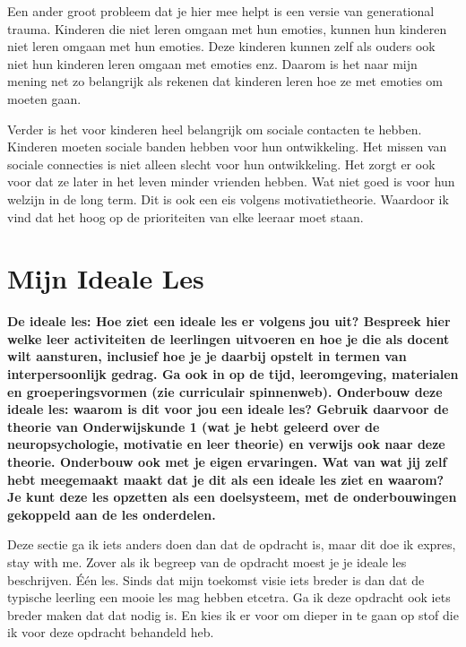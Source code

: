 \documentclass{article}
\begin{document}
            Een ander groot probleem dat je hier mee helpt is een versie van generational trauma. Kinderen die niet leren omgaan met hun emoties, kunnen hun kinderen niet leren omgaan met hun emoties. Deze kinderen kunnen zelf als ouders ook niet hun kinderen leren omgaan met emoties enz. Daarom is het naar mijn mening net zo belangrijk als rekenen dat kinderen leren hoe ze met emoties om moeten gaan.
            
            Verder is het voor kinderen heel belangrijk om sociale contacten te hebben. Kinderen moeten sociale banden hebben voor hun ontwikkeling.\cite{social-isolation-affect-a-childs-mental-health-and-development} Het missen van sociale connecties is niet alleen slecht voor hun ontwikkeling. Het zorgt er ook voor dat ze later in het leven minder vrienden hebben. Wat niet goed is voor hun welzijn in de long term. Dit is ook een eis volgens motivatietheorie. Waardoor ik vind dat het hoog op de prioriteiten van elke leeraar moet staan.
    
    
    \section{Mijn Ideale Les}

        \textbf{De ideale les: Hoe ziet een ideale les er volgens jou uit? Bespreek hier welke leer activiteiten de leerlingen uitvoeren en hoe je die als docent wilt aansturen, inclusief hoe je je daarbij opstelt in termen van interpersoonlijk gedrag. Ga ook in op de tijd, leeromgeving, materialen en groeperingsvormen (zie curriculair spinnenweb). Onderbouw deze ideale les: waarom is dit voor jou een ideale les? Gebruik daarvoor de theorie van Onderwijskunde 1 (wat je hebt geleerd over de neuropsychologie, motivatie en leer theorie) en verwijs ook naar deze theorie. Onderbouw ook met je eigen ervaringen. Wat van wat jij zelf hebt meegemaakt maakt dat je dit als een ideale les ziet en waarom? Je kunt deze les opzetten als een doelsysteem, met de onderbouwingen gekoppeld aan de les onderdelen.}
        
        Deze sectie ga ik iets anders doen dan dat de opdracht is, maar dit doe ik expres, stay with me. Zover als ik begreep van de opdracht moest je je ideale les beschrijven. Één les. Sinds dat mijn toekomst visie iets breder is dan dat de typische leerling een mooie les mag hebben etcetra. Ga ik deze opdracht ook iets breder maken dat dat nodig is. En kies ik er voor om dieper in te gaan op stof die ik voor deze opdracht behandeld heb. 
        
\end{document}
